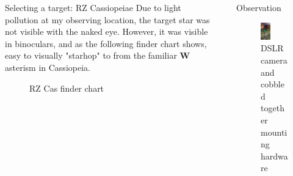 \documentclass[final]{beamer}
\newlength{\sepwidth}
\newlength{\colwidth}
\newcommand{\separatorcolumn}{\begin{column}{\sepwidth}\end{column}}
\begin{document}
\begin{frame}[t]
\begin{columns}[t]
\begin{column}{\colwidth}
\begin{block}{Selecting a target: RZ Cassiopeiae}
    Due to light pollution at my observing location, the target star was not visible 
    with the naked eye. However, it was visible in binoculars, and as the following
    finder chart shows, easy to visually "starhop" to from the familiar \textbf{W} asterism
    in Cassiopeia.

    \begin{figure}
      \centering
      \caption{RZ Cas finder chart}
    \end{figure}
  \end{block}


\end{column}

\separatorcolumn

\begin{column}{\colwidth}

  \begin{block}{Observation}
    \begin{figure}
      \centering
      \includegraphics[width=0.35\textwidth]{camera_and_mount-crop.jpg}
      \caption{DSLR camera and cobbled together mounting hardware}
    \end{figure}


\end{block}
\end{column}
\end{columns}
\end{frame}
\end{document}

